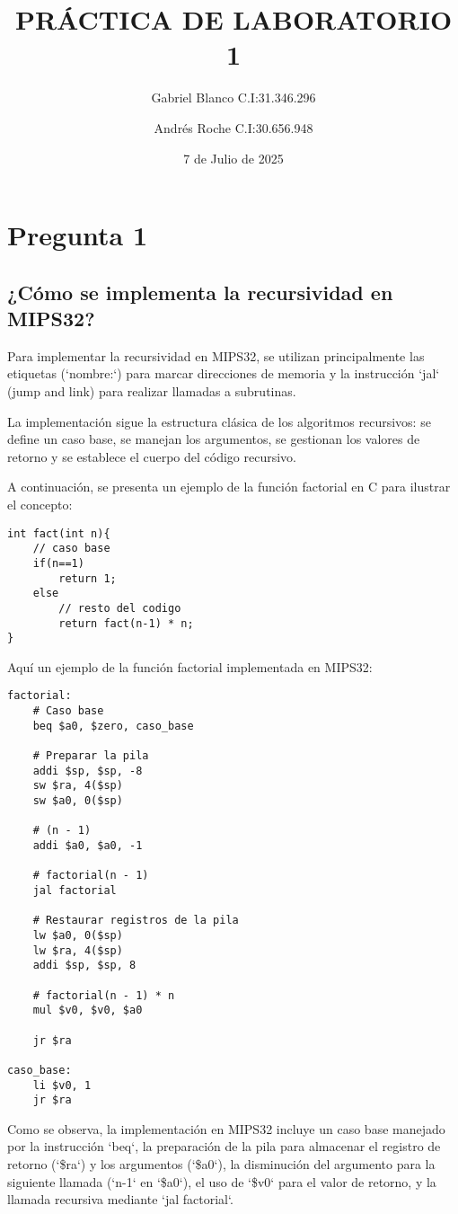 \documentclass{article}
\title{PRÁCTICA DE LABORATORIO 1}
\author{
    Gabriel Blanco C.I:31.346.296
    \and
    Andrés Roche C.I:30.656.948
}
\date{7 de Julio de 2025} %
\begin{document}
\maketitle %
\textbf{}

\section*{Pregunta 1}
\subsection*{¿Cómo se implementa la recursividad en MIPS32?}
Para implementar la recursividad en MIPS32, se utilizan principalmente las etiquetas (`nombre:`) para marcar direcciones de memoria y la instrucción `jal` (jump and link) para realizar llamadas a subrutinas.

La implementación sigue la estructura clásica de los algoritmos recursivos: se define un caso base, se manejan los argumentos, se gestionan los valores de retorno y se establece el cuerpo del código recursivo.

A continuación, se presenta un ejemplo de la función factorial en C para ilustrar el concepto:
\begin{lstlisting}[style=C, caption={Función Factorial en C}]
int fact(int n){
	// caso base
	if(n==1)
		return 1;
	else
		// resto del codigo
		return fact(n-1) * n;
}
\end{lstlisting}

Aquí un ejemplo de la función factorial implementada en MIPS32:
\begin{lstlisting}[style=Mips32, caption={Función Factorial en MIPS32}]
factorial:
	# Caso base
	beq $a0, $zero, caso_base
	
	# Preparar la pila
	addi $sp, $sp, -8
	sw $ra, 4($sp)
	sw $a0, 0($sp)

	# (n - 1)
	addi $a0, $a0, -1

	# factorial(n - 1)
	jal factorial
	
	# Restaurar registros de la pila
	lw $a0, 0($sp)
	lw $ra, 4($sp)
	addi $sp, $sp, 8

	# factorial(n - 1) * n
	mul $v0, $v0, $a0
	
	jr $ra
	
caso_base:
	li $v0, 1
	jr $ra
\end{lstlisting}
Como se observa, la implementación en MIPS32 incluye un caso base manejado por la instrucción `beq`, la preparación de la pila para almacenar el registro de retorno (`\$ra`) y los argumentos (`\$a0`), la disminución del argumento para la siguiente llamada (`n-1` en `\$a0`), el uso de `\$v0` para el valor de retorno, y la llamada recursiva mediante `jal factorial`.
\end{document}
